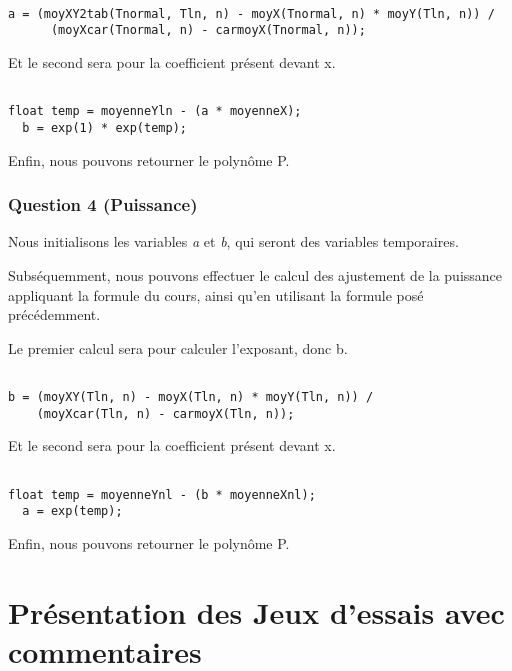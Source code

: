 \documentclass[letter]{article}
\begin{document}
\begin{verbatim}

a = (moyXY2tab(Tnormal, Tln, n) - moyX(Tnormal, n) * moyY(Tln, n)) /
      (moyXcar(Tnormal, n) - carmoyX(Tnormal, n));

\end{verbatim}

Et le second sera pour la coefficient présent devant x.


\begin{verbatim}

float temp = moyenneYln - (a * moyenneX);
  b = exp(1) * exp(temp);

\end{verbatim}

Enfin, nous pouvons retourner le polynôme P.



\subsubsection{Question 4 (Puissance)}
\label{sec:org4dfbb08}

Nous initialisons les variables \emph{a} et \emph{b}, qui seront des variables temporaires.


Subséquemment, nous pouvons effectuer le calcul des ajustement de la puissance appliquant la formule du cours, ainsi qu'en utilisant la formule posé précédemment.

Le premier calcul sera pour calculer l'exposant, donc b.

\begin{verbatim}

b = (moyXY(Tln, n) - moyX(Tln, n) * moyY(Tln, n)) /
    (moyXcar(Tln, n) - carmoyX(Tln, n));

\end{verbatim}

Et le second sera pour la coefficient présent devant x.


\begin{verbatim}

float temp = moyenneYnl - (b * moyenneXnl);
  a = exp(temp);

\end{verbatim}

Enfin, nous pouvons retourner le polynôme P.

\section{Présentation des Jeux d'essais avec commentaires}
\label{sec:orgff392cb}
\end{document}
